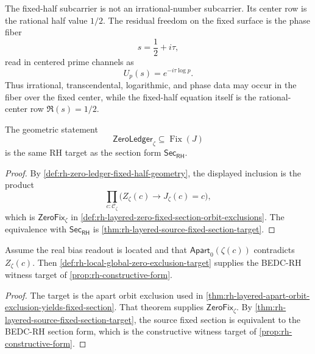 \begin{principle}
\label{prin:rh-fixed-half-rational-center-phase-fiber}
The fixed-half subcarrier is not an irrational-number subcarrier. Its
center row is the rational half value $1/2$. The residual freedom on the
fixed surface is the phase fiber
$$
s=\frac12+i\tau,
$$
read in centered prime channels as
$$
U_p(s)=e^{-i\tau\log p}.
$$
Thus irrational, transcendental, logarithmic, and phase data may occur in
the fiber over the fixed center, while the fixed-half equation itself is
the rational-center row $\Re(s)=1/2$.
\end{principle}

\begin{theorem}
\label{thm:rh-geometric-compression-zero-ledger-fixed-half}
The geometric statement
$$
\mathsf{ZeroLedger}_{\zeta}
\subseteq
\operatorname{Fix}(J)
$$
is the same RH target as the section form $\mathsf{Sec}_{\mathsf{RH}}$.
\end{theorem}

\begin{proof}
By \autoref{def:rh-zero-ledger-fixed-half-geometry}, the displayed
inclusion is the product
$$
\prod_{c:\mathcal C_{\zeta}}
\bigl(Z_{\zeta}(c)\to J_{\zeta}(c)=c\bigr),
$$
which is $\mathsf{ZeroFix}_{\zeta}$ in
\autoref{def:rh-layered-zero-fixed-section-orbit-exclusions}. The
equivalence with $\mathsf{Sec}_{\mathsf{RH}}$ is
\autoref{thm:rh-layered-source-fixed-section-target}.
\end{proof}

\begin{theorem}
\label{thm:rh-local-global-zero-exclusion-gives-rh-target}
Assume the real bias readout is located and that
$\mathsf{Apart}_{0}(\zeta(c))$ contradicts $Z_{\zeta}(c)$. Then
\autoref{def:rh-local-global-zero-exclusion-target} supplies the BEDC-RH
witness target of \autoref{prop:rh-constructive-form}.
\end{theorem}

\begin{proof}
The target is the apart orbit exclusion used in
\autoref{thm:rh-layered-apart-orbit-exclusion-yields-fixed-section}. That
theorem supplies $\mathsf{ZeroFix}_{\zeta}$. By
\autoref{thm:rh-layered-source-fixed-section-target}, the source fixed
section is equivalent to the BEDC-RH section form, which is the constructive
witness target of \autoref{prop:rh-constructive-form}.
\end{proof}

